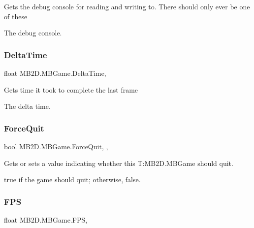 Gets the debug console for reading and writing to. There should only ever be one of these 

The debug console.\hypertarget{class_m_b2_d_1_1_m_b_game_ad5f17615f6a86c891635491cba99337d}{}\label{class_m_b2_d_1_1_m_b_game_ad5f17615f6a86c891635491cba99337d} 
\subsubsection{\texorpdfstring{Delta\+Time}{DeltaTime}}
{\footnotesize\ttfamily float M\+B2\+D.\+M\+B\+Game.\+Delta\+Time\hspace{0.3cm}{\ttfamily [static]}, {\ttfamily [get]}}



Gets time it took to complete the last frame 

The delta time.\hypertarget{class_m_b2_d_1_1_m_b_game_a74cd19bc8809a473a639aed105f0f4e9}{}\label{class_m_b2_d_1_1_m_b_game_a74cd19bc8809a473a639aed105f0f4e9} 
\subsubsection{\texorpdfstring{Force\+Quit}{ForceQuit}}
{\footnotesize\ttfamily bool M\+B2\+D.\+M\+B\+Game.\+Force\+Quit\hspace{0.3cm}{\ttfamily [static]}, {\ttfamily [get]}, {\ttfamily [set]}}



Gets or sets a value indicating whether this T\+:\+M\+B2\+D.\+M\+B\+Game should quit. 

{\ttfamily true} if the game should quit; otherwise, {\ttfamily false}.\hypertarget{class_m_b2_d_1_1_m_b_game_acb9e6dfedc44ee2df89aa9714f098faf}{}\label{class_m_b2_d_1_1_m_b_game_acb9e6dfedc44ee2df89aa9714f098faf} 
\subsubsection{\texorpdfstring{F\+PS}{FPS}}
{\footnotesize\ttfamily float M\+B2\+D.\+M\+B\+Game.\+F\+PS\hspace{0.3cm}{\ttfamily [static]}, {\ttfamily [get]}}



